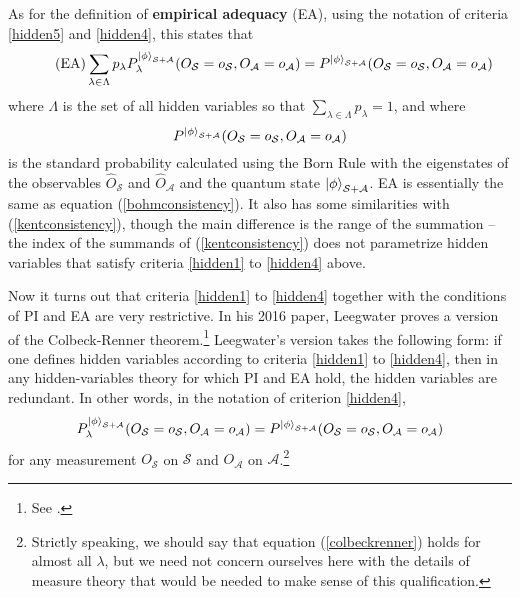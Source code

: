 As for the definition of \textbf{empirical adequacy} (EA), using the notation of criteria \ref{hidden5} and \ref{hidden4}, this states that
\begin{equation}\tag{EA}\label{adeq}
	\sum_{\lambda\in\Lambda}p_\lambda P_\lambda^{\ket{\phi}_{\mathcal{S}+\mathcal{A}}}(O_\mathcal{S}=o_\mathcal{S},O_\mathcal{A}=o_\mathcal{A})=P^{\ket{\phi}_{\mathcal{S}+\mathcal{A}}}(O_\mathcal{S}=o_\mathcal{S},O_\mathcal{A}=o_\mathcal{A})
\end{equation}
where $\Lambda$ is the set of all hidden variables so that $\sum_{\lambda\in\Lambda} p_\lambda = 1$, and where 
$$P^{\ket{\phi}_{\mathcal{S}+\mathcal{A}}}(O_\mathcal{S}=o_\mathcal{S},O_\mathcal{A}=o_\mathcal{A})$$
 is the standard probability calculated using the Born Rule with the eigenstates of the observables $\hat{O}_\mathcal{S}$ and $\hat{O}_\mathcal{A}$ and the quantum state $\ket{\phi}_{\mathcal{S}+\mathcal{A}}$. EA is essentially the same as equation (\ref{bohmconsistency}). It also has some similarities with (\ref{kentconsistency}), though the main difference is the range of the summation -- the index of the summands of (\ref{kentconsistency}) does not parametrize hidden variables that satisfy criteria \ref{hidden1} to \ref{hidden4} above.

Now it turns out that criteria \ref{hidden1} to \ref{hidden4} together with the conditions of PI and EA are very restrictive. In his 2016 paper, Leegwater proves a version of the Colbeck-Renner theorem.\footnote{See \cite{LeegwaterGijs2016Aitf}.} Leegwater's version takes the following form: if one defines hidden variables according to criteria \ref{hidden1} to \ref{hidden4}, then in any hidden-variables theory for which PI and EA hold, the hidden variables are redundant. In other words, in the notation of criterion \ref{hidden4},
\begin{equation}\label{colbeckrenner}
P_\lambda^{\ket{\phi}_{\mathcal{S}+\mathcal{A}}}(O_\mathcal{S}=o_\mathcal{S},O_\mathcal{A}=o_\mathcal{A})=P^{\ket{\phi}_{\mathcal{S}+\mathcal{A}}}(O_\mathcal{S}=o_\mathcal{S},O_\mathcal{A}=o_\mathcal{A})
\end{equation}
for any measurement $O_\mathcal{S}$ on $\mathcal{S}$ and $O_\mathcal{A}$ on $\mathcal{A}$.\footnote{Strictly speaking, we should say that equation (\ref{colbeckrenner}) holds for almost all $\lambda$, but we need not concern ourselves here with the details of measure theory that would be needed to make sense of this qualification.} 


